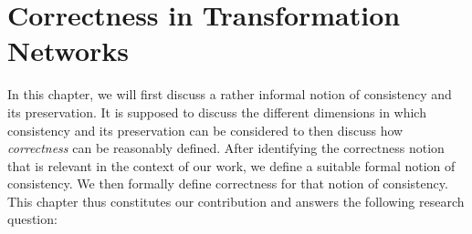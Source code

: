 \chapter{Correctness in Transformation Networks
}
\label{chap:correctness}



In this chapter, we will first discuss a rather informal notion of consistency and its preservation. It is supposed to discuss the different dimensions in which consistency and its preservation can be considered to then discuss how \emph{correctness} can be reasonably defined.
After identifying the correctness notion that is relevant in the context of our work, we define a suitable formal notion of consistency.
We then formally define correctness for that notion of consistency.
This chapter thus constitutes our contribution  and answers the following research question:







